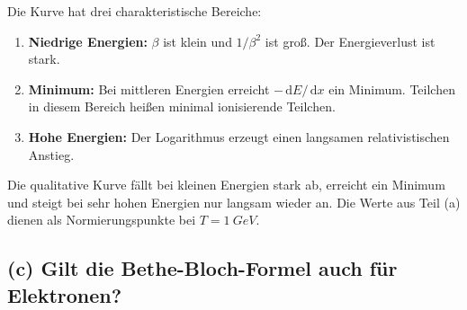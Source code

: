 \documentclass[11pt,a4paper]{scrartcl}
\newcommand{\dd}{\,\mathrm{d}}
\theoremstyle{definition}
\theoremstyle{plain}
\theoremstyle{remark}
\begin{document}
\begin{calculationbox}[title=Form der Bethe-Bloch-Kurve]
Die Kurve hat drei charakteristische Bereiche:
\begin{enumerate}
    \item \textbf{Niedrige Energien:} $\beta$ ist klein und $1/\beta^2$ ist gro\ss{}. Der Energieverlust ist stark.
    \item \textbf{Minimum:} Bei mittleren Energien erreicht $-\dd E/\dd x$ ein Minimum. Teilchen in diesem Bereich hei\ss{}en minimal ionisierende Teilchen.
    \item \textbf{Hohe Energien:} Der Logarithmus erzeugt einen langsamen relativistischen Anstieg.
\end{enumerate}
\end{calculationbox}

\begin{calculationbox}[title=Qualitative log-log-Skizze]
\begin{center}
\end{center}
\end{calculationbox}

\begin{answerbox}
Die qualitative Kurve f\"allt bei kleinen Energien stark ab, erreicht ein Minimum und steigt bei sehr hohen Energien nur langsam wieder an. Die Werte aus Teil (a) dienen als Normierungspunkte bei $T=\SI{1}{GeV}$.
\end{answerbox}

\subsection*{(c) Gilt die Bethe-Bloch-Formel auch f\"ur Elektronen?}
\end{document}
